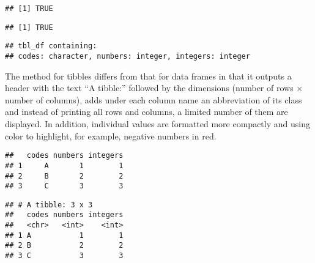 \documentclass[krantz2]{krantz}\usepackage{knitr}
\begin{document}
\begin{knitrout}\footnotesize
{}\color{fgcolor}\begin{kframe}
\begin{alltt}
 \hlkwb{<-} \hlstd{(} \hlstd{=} \hlstd{(}\hlstd{,} \hlstd{,} \hlstd{),}  \hlstd{=} \hlopt{:}\hlstd{,}  \hlstd{=} \hlopt{:}\hlstd{)}
\end{alltt}
\begin{verbatim}
## [1] TRUE
\end{verbatim}
\begin{alltt}
\end{alltt}
\begin{verbatim}
## [1] TRUE
\end{verbatim}
\begin{alltt}
\end{alltt}
\begin{verbatim}
## tbl_df containing:
## codes: character, numbers: integer, integers: integer
\end{verbatim}
\end{kframe}
\end{knitrout}

The  method for tibbles differs from that for data frames in that it outputs a header with the text ``A tibble:'' followed by the dimensions (number of rows $\times$ number of columns), adds under each column name an abbreviation of its class and instead of printing all rows and columns, a limited number of them are displayed. In addition, individual values are formatted more compactly and using color to highlight, for example, negative numbers in red.

\begin{knitrout}\footnotesize
{}\color{fgcolor}\begin{kframe}
\begin{alltt}
\end{alltt}
\begin{verbatim}
##   codes numbers integers
## 1     A       1        1
## 2     B       2        2
## 3     C       3        3
\end{verbatim}
\begin{alltt}
\end{alltt}
\begin{verbatim}
## # A tibble: 3 x 3
##   codes numbers integers
##   <chr>   <int>    <int>
## 1 A           1        1
## 2 B           2        2
## 3 C           3        3
\end{verbatim}
\end{kframe}
\end{knitrout}
\end{document}
